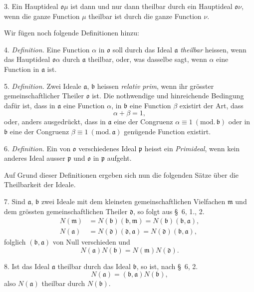 \documentclass{article}
\begin{document}

3. Ein Hauptideal $\mathfrak{o}\mu$ ist dann und nur dann theilbar durch ein Hauptideal $\mathfrak{o}\nu$, wenn die ganze Function $\mu$ theilbar ist durch die ganze Function $\nu$.

Wir fügen noch folgende Definitionen hinzu:

4. \emph{Definition.} Eine Function $\alpha$ in $\mathfrak{o}$ soll durch das Ideal $\mathfrak{a}$ \emph{theilbar} heissen, wenn das Hauptideal $\mathfrak{o}\alpha$ durch $\mathfrak{a}$ theilbar, oder, was dasselbe sagt, wenn $\alpha$ eine Function in $\mathfrak{a}$ ist.

5. \emph{Definition.} Zwei Ideale $\mathfrak{a}$, $\mathfrak{b}$ heissen \emph{relativ prim}, wenn ihr grösster gemeinschaftlicher Theiler $\mathfrak{o}$ ist. Die nothwendige und hinreichende Bedingung dafür ist, dass in $\mathfrak{a}$ eine Function $\alpha$, in $\mathfrak{b}$ eine Function $\beta$ existirt der Art, dass
\[ \alpha + \beta = 1, \]
oder, anders ausgedrückt, dass in $\mathfrak{a}$ eine der Congruenz $\alpha \equiv 1 \ (\text{mod.}\,\mathfrak{b})$ oder in $\mathfrak{b}$ eine der Congruenz $\beta \equiv 1 \ (\text{mod.}\,\mathfrak{a})$ genügende Function existirt.

6. \emph{Definition.} Ein von $\mathfrak{o}$ verschiedenes Ideal $\mathfrak{p}$ heisst ein \emph{Primideal}, wenn kein anderes Ideal ausser $\mathfrak{p}$ und $\mathfrak{o}$ in $\mathfrak{p}$ aufgeht.

Auf Grund dieser Definitionen ergeben sich nun die folgenden Sätze über die Theilbarkeit der Ideale.

7. Sind $\mathfrak{a}$, $\mathfrak{b}$ zwei Ideale mit dem kleinsten gemeinschaftlichen Vielfachen $\mathfrak{m}$ und dem grössten gemeinschaftlichen Theiler $\mathfrak{d}$, so folgt aus §~6, 1., 2.
\[ \begin{aligned} N(\mathfrak{m}) &= N(\mathfrak{b})(\mathfrak{b}, \mathfrak{m}) = N(\mathfrak{b})(\mathfrak{b}, \mathfrak{a}), \\ N(\mathfrak{a}) &= N(\mathfrak{d})(\mathfrak{d}, \mathfrak{a}) = N(\mathfrak{d})(\mathfrak{b}, \mathfrak{a}), \end{aligned} \]
folglich $(\mathfrak{b}, \mathfrak{a})$ von Null verschieden und
\[ N(\mathfrak{a})N(\mathfrak{b}) = N(\mathfrak{m})N(\mathfrak{d}). \]

8. Ist das Ideal $\mathfrak{a}$ theilbar durch das Ideal $\mathfrak{b}$, so ist, nach §~6, 2.
\[ N(\mathfrak{a}) = (\mathfrak{b}, \mathfrak{a})N(\mathfrak{b}), \]
also $N(\mathfrak{a})$ theilbar durch $N(\mathfrak{b})$.
\end{document}

